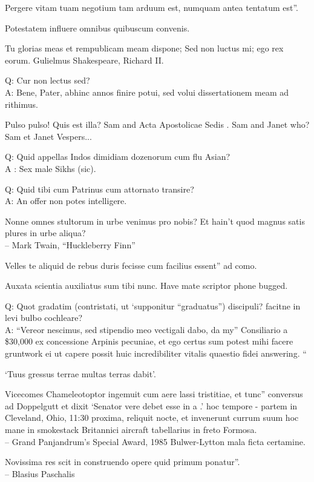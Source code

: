 \documentclass[titlepage,12pt]{memoir}
\begin{document}
Pergere vitam tuam negotium tam arduum est, numquam antea tentatum est”.

Potestatem influere omnibus quibuscum convenis.

Tu glorias meas et rempublicam meam dispone;
Sed non luctus mi; ego rex eorum.
Gulielmus Shakespeare, Richard II.

Q: Cur non lectus sed?\\
A: Bene, Pater, abhinc annos finire potui, sed volui
dissertationem meam ad rithimus.

Pulso pulso!
Quis est illa?
Sam and Acta Apostolicae Sedis .
Sam and Janet who?
Sam et Janet Vespers...

Q: Quid appellas Indos dimidiam dozenorum cum flu Asian?\\
A : Sex male Sikhs (sic).

Q: Quid tibi cum Patrinus cum attornato transire?\\
A: An offer non potes intelligere.

Nonne omnes stultorum in urbe venimus pro nobis? Et hain’t quod magnus
satis plures in urbe aliqua?
\\-- Mark Twain, “Huckleberry Finn”

Velles te aliquid de rebus duris fecisse cum facilius essent”
ad como.

Auxata scientia auxiliatus sum tibi nunc. Have mate scriptor phone bugged.

Q: Quot gradatim (contristati, ut ‘supponitur “graduatus”) discipuli?
facitne in levi bulbo cochleare?\\
A: “Vereor nescimus, sed stipendio meo vectigali dabo, da my”
Consiliario a \$30,000 ex concessione Arpinis pecuniae, et ego certus sum
potest mihi facere gruntwork ei ut capere possit
huic incredibiliter vitalis quaestio fidei answering. “

‘Tuus gressus terrae multas terras dabit’.

Vicecomes Chameleotoptor ingemuit cum aere lassi tristitiae, et tunc”
conversus ad Doppelgutt et dixit ‘Senator vere debet esse in a .’
hoc tempore - partem in Cleveland, Ohio, 11:30 proxima, reliquit
nocte, et invenerunt currum suum hoc mane in smokestack Britannici
aircraft tabellarius in freto Formosa.
\\-- Grand Panjandrum’s Special Award, 1985 Bulwer-Lytton
mala ficta certamine.

Novissima res scit in construendo opere quid primum ponatur”.
\\-- Blasius Paschalis
\end{document}
